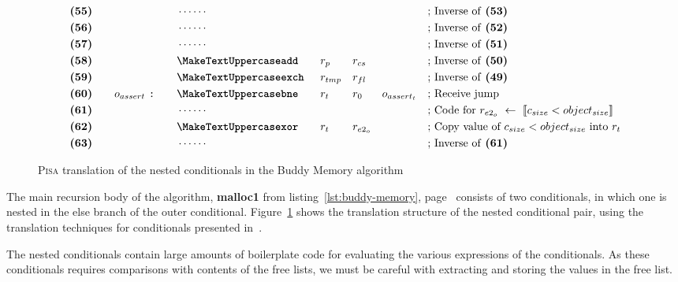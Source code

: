 \begin{figure}[ht]
\begin{subfigure}{.7\textwidth}
{\begin{minipage}{\linewidth}
\begin{alignat*}{7}
                &\textbf{(55)}\quad&& &&\cdots\cdots && && && &&\text{; Inverse of \textbf{(53)}}\\
                &\textbf{(56)}\quad&& &&\cdots\cdots && && && &&\text{; Inverse of \textbf{(52)}}\\
                &\textbf{(57)}\quad&& &&\cdots\cdots && && && &&\text{; Inverse of \textbf{(51)}}\\
                &\textbf{(58)}\quad&& &&\inst{add} &&r_{p} && r_{cs} && && \text{; Inverse of \textbf{(50)}}\\
                &\textbf{(59)}\quad&& &&\inst{exch} &&r_{tmp} && r_{fl} && && \text{; Inverse of \textbf{(49)}}\\
                &\textbf{(60)}\quad&&o_{assert}\ \texttt{:}\quad &&\inst{bne} &&r_{t} && r_0 && o_{assert_t} && \text{; Receive jump}\\
                &\textbf{(61)}\quad&& &&\cdots\cdots && && && &&\text{; Code for $r_{e2_o}\ \leftarrow\ \llbracket c_{size} < object_{size} \rrbracket$}\\
                &\textbf{(62)}\quad&& &&\inst{xor}\quad &&r_t && r_{e2_o} && &&\text{; Copy value of $c_{size} < object_{size}$ into $r_t$}\\        
                &\textbf{(63)}\quad&& &&\cdots\cdots && && && &&\text{; Inverse of \textbf{(61)}}\\ 
            \end{alignat*}
        \end{minipage}
    }
    \end{subfigure}
    \caption{\textsc{Pisa} translation of the nested conditionals in the Buddy Memory algorithm}
    \label{fig:pisa-buddy-conditionals}
\end{figure}

The main recursion body of the algorithm, \textbf{malloc1} from listing~\ref{lst:buddy-memory}, page~\pageref{lst:buddy-memory} consists of two conditionals, in which one is nested in the else branch of the outer conditional. Figure~\ref{fig:pisa-buddy-conditionals} shows the translation structure of the nested conditional pair, using the translation techniques for conditionals presented in~\cite{ha:translation}.

The nested conditionals contain large amounts of boilerplate code for evaluating the various expressions of the conditionals. As these conditionals requires comparisons with contents of the free lists, we must be careful with extracting and storing the values in the free list. 

